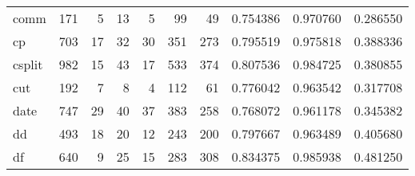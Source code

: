 \begin{tabular}{lrrrrrrrrr}
comm      &                    171 &                                  5 &                                13 &                                5 &                                99 &                              49 &                                0.754386 &                               0.970760 &                             0.286550 \\
cp        &                    703 &                                 17 &                                32 &                               30 &                               351 &                             273 &                                0.795519 &                               0.975818 &                             0.388336 \\
csplit    &                    982 &                                 15 &                                43 &                               17 &                               533 &                             374 &                                0.807536 &                               0.984725 &                             0.380855 \\
cut       &                    192 &                                  7 &                                 8 &                                4 &                               112 &                              61 &                                0.776042 &                               0.963542 &                             0.317708 \\
date      &                    747 &                                 29 &                                40 &                               37 &                               383 &                             258 &                                0.768072 &                               0.961178 &                             0.345382 \\
dd        &                    493 &                                 18 &                                20 &                               12 &                               243 &                             200 &                                0.797667 &                               0.963489 &                             0.405680 \\
df        &                    640 &                                  9 &                                25 &                               15 &                               283 &                             308 &                                0.834375 &                               0.985938 &                             0.481250 \\

\end{tabular}
